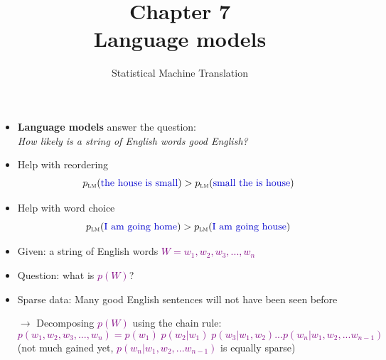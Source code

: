 \documentclass[landscape]{slides}
\newcommand{\example}[1]{\textcolor{darkblue}{\rm #1}}
\newcommand{\maths}[1]{\textcolor{purple}{#1}}
\begin{document}
\title[Chapter 7: Language Models]{Chapter 7\\[1cm] Language models}
\author[Philipp Koehn]{}
\date{Statistical Machine Translation}

\maketitle


\vspace{10mm}
\begin{itemize}
\item {\bf Language models} answer the question:\\[4mm] {\em How likely is a string of English words good English?}
\item Help with reordering
\maths{\begin{equation*}
p_\text{\sc lm}(\text{\example{the house is small}}) > p_\text{\sc lm}(\text{\example{small the is house}})
\end{equation*}}
\item Help with word choice
\maths{\begin{equation*}
p_\text{\sc lm}(\text{\example{I am going home}}) > p_\text{\sc lm}(\text{\example{I am going house}})
\end{equation*}}
\end{itemize}


\vspace{10mm}
\begin{itemize}
\item Given: a string of English words \maths{$W = w_1,w_2,w_3,...,w_n$}
\item Question: what is \maths{$p(W)$}?
\item Sparse data: Many good English sentences will not have been seen before
\item[$\rightarrow$] Decomposing \maths{$p(W)$} using the chain rule:
\maths{\begin{equation*}
p(w_1,w_2,w_3,...,w_n) = p(w_1)\;p(w_2|w_1)\;p(w_3|w_1,w_2) ... p(w_n|w_1,w_2,...w_{n-1})
\end{equation*}}
(not much gained yet, \maths{$p(w_n|w_1,w_2,...w_{n-1})$} is equally sparse)
\end{itemize}
\end{document}
